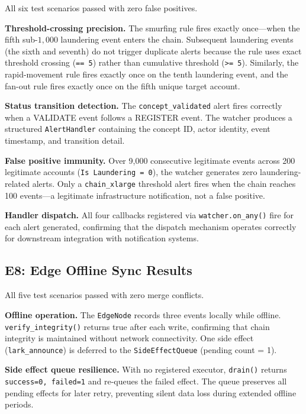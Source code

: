 All six test scenarios passed with zero false positives.

\textbf{Threshold-crossing precision.} The smurfing rule fires exactly once---when the fifth sub-$1,000$ laundering event enters the chain. Subsequent laundering events (the sixth and seventh) do not trigger duplicate alerts because the rule uses exact threshold crossing (\texttt{==\ 5}) rather than cumulative threshold (\texttt{\textgreater{}=\ 5}). Similarly, the rapid-movement rule fires exactly once on the tenth laundering event, and the fan-out rule fires exactly once on the fifth unique target account.

\textbf{Status transition detection.} The \texttt{concept\_validated} alert fires correctly when a VALIDATE event follows a REGISTER event. The watcher produces a structured \texttt{AlertHandler} containing the concept ID, actor identity, event timestamp, and transition detail.

\textbf{False positive immunity.} Over 9,000 consecutive legitimate events across 200 legitimate accounts (\texttt{Is\ Laundering\ =\ 0}), the watcher generates zero laundering-related alerts. Only a \texttt{chain\_xlarge} threshold alert fires when the chain reaches 100 events---a legitimate infrastructure notification, not a false positive.

\textbf{Handler dispatch.} All four callbacks registered via \texttt{watcher.on\_any()} fire for each alert generated, confirming that the dispatch mechanism operates correctly for downstream integration with notification systems.

\subsection{E8: Edge Offline Sync Results}\label{e8-edge-offline-sync-results}

All five test scenarios passed with zero merge conflicts.

\textbf{Offline operation.} The \texttt{EdgeNode} records three events locally while offline. \texttt{verify\_integrity()} returns true after each write, confirming that chain integrity is maintained without network connectivity. One side effect (\texttt{lark\_announce}) is deferred to the \texttt{SideEffectQueue} (pending count = 1).

\textbf{Side effect queue resilience.} With no registered executor, \texttt{drain()} returns \texttt{success=0,\ failed=1} and re-queues the failed effect. The queue preserves all pending effects for later retry, preventing silent data loss during extended offline periods.

